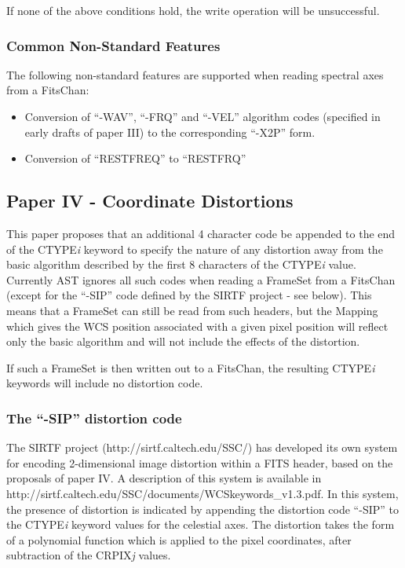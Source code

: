 \documentclass[twoside,11pt]{article}
\newcommand{\htmladdnormallink}[2]{#1}
\begin{document}
If none of the above conditions hold, the write operation will be
unsuccessful.

\subsubsection{Common Non-Standard Features}
The following non-standard features are supported when reading spectral
axes from a FitsChan:

\begin{itemize}
\item Conversion of ``-WAV'', ``-FRQ'' and ``-VEL'' algorithm codes
(specified in early drafts of paper III) to the corresponding 
``-X2P'' form.
\item Conversion of ``RESTFREQ'' to ``RESTFRQ''
\end{itemize}

\subsection{Paper IV - Coordinate Distortions}

This paper proposes that an additional 4 character code be appended to
the end of the CTYPE\emph{i} keyword to specify the nature of any
distortion away from the basic algorithm described by the first 8
characters of the CTYPE\emph{i} value. Currently AST ignores all such
codes when reading a FrameSet from a
FitsChan (except for the ``-SIP'' code
defined by the SIRTF project - see below). This means that a FrameSet can
still be read from such headers, but the Mapping which 
gives the WCS
position associated with a given pixel position will reflect only the
basic algorithm and will not include the effects of the distortion.

If such a FrameSet is then written out to a FitsChan, the resulting 
CTYPE\emph{i} keywords will include no distortion code.

\subsubsection{The ``-SIP'' distortion code}

The SIRTF project
(\htmladdnormallink{http://sirtf.caltech.edu/SSC/}{http://sirtf.caltech.edu/SSC/})
has developed its own system for encoding 2-dimensional image distortion
within a FITS header, based on the proposals of paper IV. A description
of this system is available in \htmladdnormallink
{http://sirtf.caltech.edu/SSC/documents/WCSkeywords\_v1.3.pdf}
{http://sirtf.caltech.edu/SSC/documents/WCSkeywords\_v1.3.pdf}. In this
system, the presence of distortion is indicated by appending the
distortion code ``-SIP'' to the CTYPE\emph{i} keyword values for the
celestial axes. The distortion takes the form of a polynomial function
which is applied to the pixel coordinates, after subtraction of the
CRPIX\emph{j} values.
\end{document}
